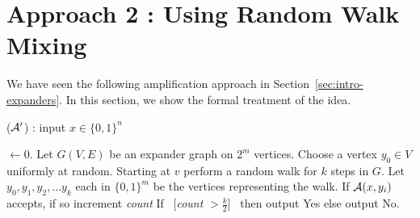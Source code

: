 
\section{Approach 2 : Using Random Walk Mixing}

We have seen the following amplification approach in Section~\ref{sec:intro-expanders}. In this section, we show the formal treatment of the idea.

\begin{algorithm}
\label{alg:expwalk-amplification}
\caption{(${\cal{A}'}$) : input $x \in \{0,1\}^n$} 
\begin{algorithmic}[1]
 $\gets 0$. 
\State Let $G(V,E)$ be an expander graph on $2^{m}$ vertices.
\State Choose a vertex $y_0 \in V$ uniformly at random. 
\State Starting at $v$ perform a random walk for $k$ steps in $G$. Let $y_0, y_1, y_2, \ldots y_k$ each in $\{0,1\}^m$ be the vertices representing the walk. 
	\State If ${\cal{A}}(x,y_i)$ accepts, if so increment {\em count}
\EndFor
\State If ~[{\em count} $> \frac{k}{2}$]~ then output {\sc Yes} else output {\sc No}.
\end{algorithmic}
\end{algorithm}

